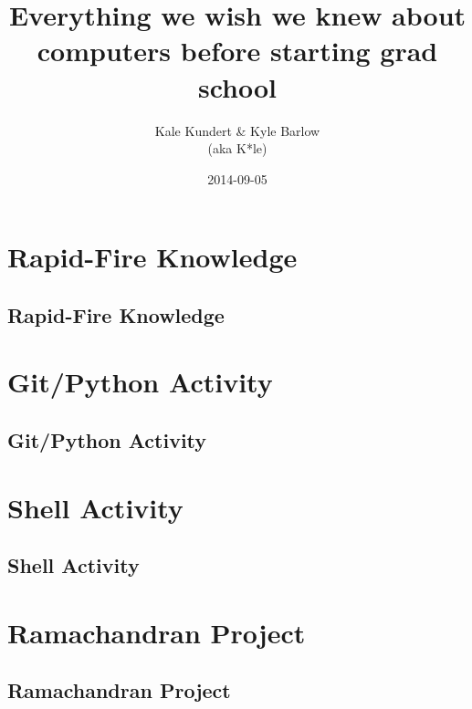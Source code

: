 \documentclass[xcolor=x11names,compress,aspectratio=43]{beamer}
\title[Bootcamp Hacking] %
{Everything we wish we knew about computers before starting grad school}
\author[] %
{Kale Kundert \& Kyle Barlow \\ (aka K*le)}
\date[] %
{2014-09-05}
\renewcommand{\(}{\begin{columns}}
\renewcommand{\)}{\end{columns}}
\newcommand{\<}[1]{\begin{column}{#1}}
\renewcommand{\>}{\end{column}}
\begin{document}


\contourlength{2pt} %

\begin{frame}
 \titlepage
\end{frame}


\section{Rapid-Fire Knowledge}
\subsection{Rapid-Fire Knowledge}











\section{Git/Python Activity}
\subsection{Git/Python Activity}



\section{Shell Activity}
\subsection{Shell Activity}



\section{Ramachandran Project}
\subsection{Ramachandran Project}


\end{document}

